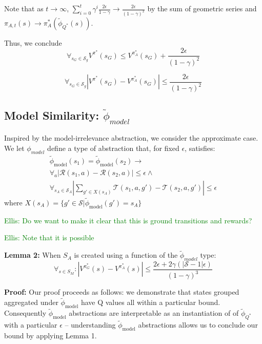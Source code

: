 \documentclass{article}
\newcommand{\ep}{\widetilde \phi}
\newcommand{\epQ}{\ep_{Q^*}}
\newcommand{\epM}{\ep_{\text{model}}}
\newcommand{\mcS}{\mathcal{S}}
\newcommand{\mcT}{\mathcal{T}}
\newcommand{\mcR}{\mathcal{R}}
\newcommand\enote[1]{\textcolor{green}{Ellis: #1}}
\begin{document}
Note that as $t \rightarrow \infty$, $\sum_{i=0}^{t}\gamma^i \frac{2\epsilon}{1-\gamma} \rightarrow \frac{2\epsilon}{(1-\gamma)^2}$ by the sum of geometric series and $\pi_{A,t}(s) \rightarrow \pi_A^*(\epQ(s))$.

Thus, we conclude
\begin{equation*}
\forall_{s_G \in \mathcal{S}_g} V^{\pi^*}(s_G) \leq  V^{\pi_{A}^*}(s_G) + \frac{2\epsilon}{(1-\gamma)^2}
\end{equation*}

\begin{equation*}
\forall_{s_G \in \mathcal{S}_g} \left | V^{\pi^*}(s_G) - V^{\pi_{A}^*}(s_G) \right | \leq  \frac{2\epsilon}{(1-\gamma)^2}
\end{equation*}



\subsection{Model Similarity: $\ep_{model}$}

Inspired by the model-irrelevance abstraction, we consider the approximate case. We let $\phi_{model}$ define a type of abstraction that, for fixed $\epsilon$, satisfies:
\begin{multline}
\epM(s_1) = \epM(s_2) \rightarrow \\
\forall_a \left| \mcR(s_1, a) - \mcR(s_2, a)\right| \leq \epsilon \wedge\ \\
\forall_{s_A \in \mcS_A} \left|\sum_{g' \in X(s_A)}\mcT(s_1, a, g') - \mcT(s_2, a,g')\right| \leq \epsilon
\end{multline}
where $X(s_A) = \{ g' \in \mcS | \epM(g') = s_A \}$

\enote{Do we want to make it clear that this is ground transitions and rewards?}

\enote{Note that it is possible }

{\bf Lemma 2:} When $S_A$ is created using a function of the $\ep_{model}$ type:
\begin{equation}
\label{eq:lemma2}
\forall_{s \in S_M} : | V^{\pi^*_G}(s) - V^{\pi^*_{A}}(s) | \leq \frac{2\epsilon + 2\gamma(|\mcS-1|\epsilon)}{(1-\gamma)^3}
\end{equation}

{\bf Proof:} Our proof proceeds as follows: we demonstrate that states grouped aggregated under $\epM$ have Q values all within a particular bound. Consequently $\epM$ abstractions are interpretable as an instantiation of of $\epQ$ with a particular $\epsilon$ -- understanding $\epM$ abstractions allows us to conclude our bound by applying Lemma 1.
\end{document}
